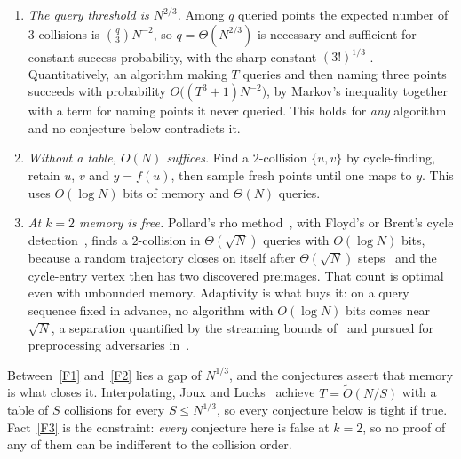 \documentclass[11pt]{article}
\theoremstyle{plain}
\theoremstyle{definition}
\begin{document}
\begin{enumerate}[label=(F\arabic*),ref=F\arabic*,leftmargin=*]\itemsep2pt
\item\label{F1} \emph{The query threshold is $N^{2/3}$.}  Among $q$
  queried points the expected number of $3$-collisions is
  $\binom{q}{3}N^{-2}$, so $q = \Theta(N^{2/3})$ is necessary and
  sufficient for constant success probability, with the sharp constant
  $(3!)^{1/3}$ \cite{STKT06}.  Quantitatively, an algorithm making $T$
  queries and then naming three points succeeds with probability
  $O\bigl((T^{3}+1)N^{-2}\bigr)$, by Markov's inequality together with a
  term for naming points it never queried.  This holds for \emph{any}
  algorithm and no conjecture below contradicts it.
\item\label{F2} \emph{Without a table, $O(N)$ suffices.}  Find a
  $2$-collision $\{u,v\}$ by cycle-finding, retain $u$, $v$ and
  $y=f(u)$, then sample fresh points until one maps to $y$.  This uses
  $O(\log N)$ bits of memory and $\Theta(N)$ queries.
\item\label{F3} \emph{At $k=2$ memory is free.}  Pollard's rho
  method~\cite{Pollard75}, with Floyd's or Brent's cycle
  detection~\cite{Brent80}, finds a $2$-collision in $\Theta(\sqrt N)$
  queries with $O(\log N)$ bits, because a random trajectory closes on
  itself after $\Theta(\sqrt N)$ steps~\cite{FO90} and the cycle-entry
  vertex then has two discovered preimages.  That count is optimal even
  with unbounded memory.  Adaptivity is what buys it: on a query sequence
  fixed in advance, no algorithm with $O(\log N)$ bits comes near
  $\sqrt N$, a separation quantified by the streaming bounds
  of~\cite{JT19,Din20b} and pursued for preprocessing adversaries
  in~\cite{DKM25}.
\end{enumerate}

Between~\ref{F1} and~\ref{F2} lies a gap of $N^{1/3}$, and the conjectures
assert that memory is what closes it.  Interpolating, Joux and
Lucks~\cite{JL09} achieve $T = \tilde O(N/S)$ with a table of $S$
collisions for every $S \leq N^{1/3}$, so every conjecture below is
tight if true.  Fact~\ref{F3} is the constraint: \emph{every} conjecture
here is false at $k=2$, so no proof of any of them can be indifferent to
the collision order.
\end{document}
